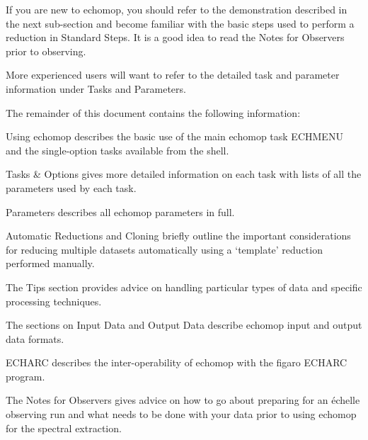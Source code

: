 \documentclass[11pt,twoside]{article}
\newcommand{\htmlref}[2]{#1}
\newcommand{\xref}[3]{#1}
\newcommand{\sunspec}[2]{#1}
\renewcommand{\sunspec}[2]{#2}
\begin{document}
If you are new to {\sc echomop}, you should refer to the demonstration
described in the next sub-section and become familiar with the basic
steps used to perform a reduction in
\sunspec{\S\ref{standard_steps}}{\htmlref{Standard
Steps}{standard_steps}}\@.
It is a good idea to read
\sunspec{Appendix~\ref{notes_for_observers}}{the \htmlref{Notes for
Observers}{notes_for_observers}} prior to observing.

More experienced users will want to refer to the detailed task and parameter
information
\sunspec{in \S\ref{tasks_options}}{under \htmlref{Tasks}{tasks_options}}
and \sunspec{\S\ref{parameters}}{\htmlref{Parameters}{parameters}}\@.

The remainder of this document contains the following information:

\sunspec{\S\ref{using_echomop}}{\htmlref{Using
{\sc echomop}}{using_echomop}} describes the basic use of the main
{\sc echomop} task ECHMENU and the single-option tasks available from the shell.

\sunspec{\S\ref{tasks_options}}{\htmlref{Tasks \&
Options}{tasks_options}} gives more detailed information on each task
with lists of all the parameters used by each task.

\sunspec{\S\ref{parameters}}{\htmlref{Parameters}{parameters}}
describes all {\sc echomop} parameters in full.

\sunspec{\S\ref{automatic_reductions} and \S\ref{cloning}}{
\htmlref{Automatic Reductions}{automatic_reductions} and
\htmlref{Cloning}{cloning}} briefly
outline the important considerations for reducing multiple datasets
automatically using a `template' reduction performed manually.

\sunspec{\S\ref{tips}}{The \htmlref{Tips}{tips} section}
provides advice on handling particular types of data and specific processing
techniques.

\sunspec{\S\ref{input_files} and \S\ref{output_files}}{The
sections on
\htmlref{Input Data}{input_data} and \htmlref{Output Data}{output_data}}
describe {\sc echomop} input and output data formats.

\sunspec{\S\ref{echarc_imp_exp}}{\htmlref{ECHARC}{echarc_imp_exp}}
describes the inter-operability of
{\sc echomop} with the \xref{{\sc figaro}}{sun86}{} \xref{ECHARC}{sun86}{ECHARC} program.

\sunspec{Appendix~\ref{notes_for_observers}}{The \htmlref{Notes for
Observers}{notes_for_observers}} gives advice on how to go about
preparing for an \'{e}chelle observing run and what needs to be done
with your data prior to using {\sc echomop} for the spectral extraction.
\end{document}
